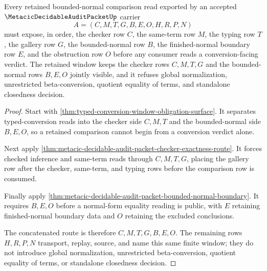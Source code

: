 \begin{theorem}
\label{thm:metacic-decidable-audit-retained-normal-window}
Every retained bounded-normal comparison read exported by an accepted $\MetacicDecidableAuditPacketUp$ carrier
$$
A=(C,M,T,G,B,E,O,H,R,P,N)
$$
must expose, in order, the checker row $C$, the same-term row $M$, the typing row $T$, the gallery row $G$, the bounded-normal row $B$, the finished-normal boundary row $E$, and the obstruction row $O$ before any consumer reads a conversion-facing verdict. The retained window keeps the checker rows $C,M,T,G$ and the bounded-normal rows $B,E,O$ jointly visible, and it refuses global normalization, unrestricted beta-conversion, quotient equality of terms, and standalone closedness decision.
\end{theorem}
\begin{proof}
Start with \autoref{thm:typed-conversion-window-obligation-surface}. It separates typed-conversion reads into the checker side $C,M,T$ and the bounded-normal side $B,E,O$, so a retained comparison cannot begin from a conversion verdict alone.

Next apply \autoref{thm:metacic-decidable-audit-packet-checker-exactness-route}. It forces checked inference and same-term reads through $C,M,T,G$, placing the gallery row after the checker, same-term, and typing rows before the comparison row is consumed.

Finally apply \autoref{thm:metacic-decidable-audit-packet-bounded-normal-boundary}. It requires $B,E,O$ before a normal-form equality reading is public, with $E$ retaining finished-normal boundary data and $O$ retaining the excluded conclusions.

The concatenated route is therefore $C,M,T,G,B,E,O$. The remaining rows $H,R,P,N$ transport, replay, source, and name this same finite window; they do not introduce global normalization, unrestricted beta-conversion, quotient equality of terms, or standalone closedness decision.
\end{proof}


